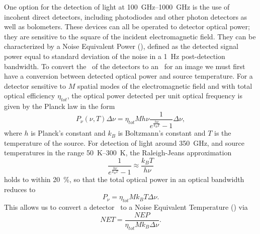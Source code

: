 One option for the detection of light at \SIrange{100}{1000}{\GHz} is the use of incohent direct detectors, including photodiodes and other photon detectors as well as bolometers.
These devices can all be operated to detector optical power; they are sensitive to the square of the incident electromagnetic field.
They can be characterized by a Noise Equivalent Power (\NEP), defined as the detected signal power equal to standard deviation of the noise in a \SI{1}{\Hz} post-detection bandwidth.
To convert the \NEP\ of the detectors to an \NETD\ for an image we must first have a conversion between detected optical power and source temperature.
For a detector sensitive to $M$ spatial modes of the electromagnetic field and with total optical efficiency $\eta_{tot}$, the optical power detected per unit optical frequency is given by the Planck law in the form
\begin{equation} \label{eqn:ch1-planck}
  P_{\nu}(\nu,T) \Delta \nu = \eta_{tot} M h \nu \frac{1}{e^{\frac{h \nu}{k_B T}} - 1} \Delta \nu,
\end{equation}
where $h$ is Planck's constant and $k_B$ is Boltzmann's constant and $T$ is the temperature of the source.
For detection of light around \SI{350}{\GHz}, and source temperatures in the range \SIrange{50}{300}{\K}, the Raleigh-Jeans approximation
\begin{equation}
  \frac{1}{e^{\frac{h \nu}{k_B T}} - 1} \approx \frac{k_B T}{h \nu}
\end{equation}
holds to within \SI{20}{\percent}, so that the total optical power in an optical bandwidth reduces to 
\begin{equation}
  P_{\nu} = \eta_{tot} M k_B T \Delta \nu.
\end{equation}
This allows us to convert a detector \NEP\ to a Noise Equivalent Temperature (\NET) via
\begin{equation}
  NET = \frac{NEP}{\eta_{tot} M k_B \Delta \nu}.
\end{equation}

